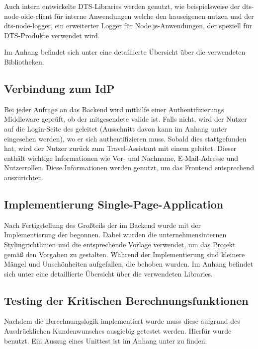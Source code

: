 Auch intern entwickelte DTS-Libraries werden genutzt, wie beispielsweise der dts-node-oidc-client für interne Anwendungen welche den hauseigenen  nutzen und der dts-node-logger, ein erweiterter Logger für Node.js-Anwendungen, der speziell für DTS-Produkte verwendet wird.

Im Anhang befindet sich unter  eine detaillierte Übersicht über die verwendeten Bibliotheken.

\subsection{Verbindung zum IdP}

Bei jeder Anfrage an das Backend wird mithilfe einer Authentifizierungs Middleware geprüft, ob der mitgesendete  valide ist. Falls nicht, wird der Nutzer auf die Login-Seite des  geleitet (Ausschnitt davon kann im Anhang unter  eingesehen werden), wo er sich authentifizieren muss. Sobald dies stattgefunden hat, wird der Nutzer zurück zum Travel-Assistant mit einem  geleitet. Dieser  enthält wichtige Informationen wie Vor- und Nachname, E-Mail-Adresse und Nutzerrollen. Diese Informationen werden genutzt, um das Frontend entsprechend auszurichten.

\subsection{Implementierung Single-Page-Application}

Nach Fertigstellung des Großteils der  im Backend wurde mit der Implementierung der  begonnen. Dabei wurden die unternehmensinternen Stylingrichtlinien und die entsprechende Vorlage verwendet, um das Projekt gemäß den Vorgaben zu gestalten. Während der Implementierung sind kleinere Mängel und Unschönheiten aufgefallen, die behoben wurden. Im Anhang befindet sich unter  eine detaillierte Übersicht über die verwendeten Libraries.

\subsection{Testing der Kritischen Berechnungsfunktionen}

Nachdem die Berechnungslogik implementiert wurde muss diese aufgrund des Ausdrücklichen Kundenwunsches ausgiebig getestet werden. Hierfür wurde  benutzt. Ein Auszug eines Unittest ist im Anhang unter  zu finden.